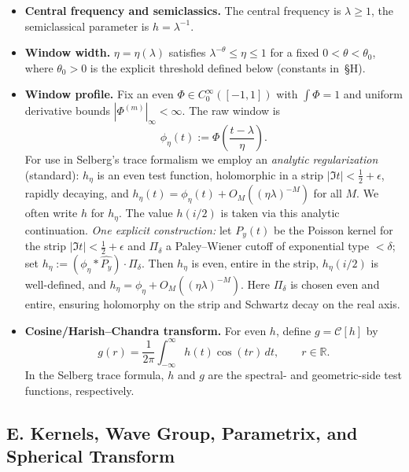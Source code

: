 \begin{itemize}
  \item \textbf{Central frequency and semiclassics.} The central frequency is $\lambda\ge 1$, the semiclassical parameter is $h=\lambda^{-1}$.
  \item \textbf{Window width.} $\eta=\eta(\lambda)$ satisfies $\lambda^{-\theta}\le \eta\le 1$ for a fixed $0<\theta<\theta_0$, where $\theta_0>0$ is the explicit threshold defined below (constants in~\S H).
  \item \textbf{Window profile.} Fix an even $\Phi\in C_0^\infty([-1,1])$ with $\int\Phi=1$ and uniform derivative bounds $|\Phi^{(m)}|_\infty<\infty$.
        The raw window is
        \[
           \phi_\eta(t):=\Phi\!\left(\frac{t-\lambda}{\eta}\right).
        \]
        For use in Selberg’s trace formalism we employ an \emph{analytic regularization} (standard): $h_\eta$ is an even test function, holomorphic in a strip
        $|\Im t|<\tfrac12+\epsilon$, rapidly decaying, and $h_\eta(t)=\phi_\eta(t)+O_M((\eta\lambda)^{-M})$ for all $M$.
        We often write $h$ for $h_\eta$. The value $h(i/2)$ is taken via this analytic continuation.
        \emph{One explicit construction:}
        let $P_y(t)$ be the Poisson kernel for the strip $|\Im t|<\tfrac12+\epsilon$ and $\Pi_\delta$ a Paley--Wiener cutoff of exponential type $<\delta$;
        set $h_\eta:=(\phi_\eta * \widehat{P_y})\cdot \Pi_\delta$. Then $h_\eta$ is even, entire in the strip, $h_\eta(i/2)$ is well-defined, and $h_\eta=\phi_\eta+O_M((\eta\lambda)^{-M})$.
        Here $\Pi_\delta$ is chosen even and entire, ensuring holomorphy on the strip and Schwartz decay on the real axis.
  \item \textbf{Cosine/Harish--Chandra transform.} For even $h$, define $g=\mathcal{C}[h]$ by
        \[
           g(r)=\frac{1}{2\pi}\int_{-\infty}^{\infty} h(t)\cos(tr)\,dt,\qquad r\in\mathbb{R}.
        \]
        In the Selberg trace formula, $h$ and $g$ are the spectral- and geometric-side test functions, respectively.
\end{itemize}

\subsection*{E. Kernels, Wave Group, Parametrix, and Spherical Transform}

